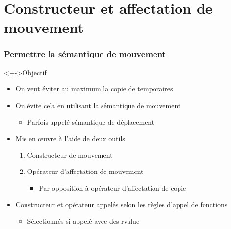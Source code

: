 \section{Constructeur et affectation de mouvement}

\begin{frame}
\frametitle{Permettre la sémantique de mouvement}
\begin{exampleblock}<+->{Objectif}
	\begin{itemize}[<+->]
	\item On veut éviter au maximum la copie de temporaires
	\end{itemize}
\end{exampleblock}
\begin{itemize}[<+->]
\item On évite cela en utilisant la sémantique de mouvement
	\begin{itemize}
	\item Parfois appelé sémantique de déplacement
	\end{itemize}
\item Mis en œuvre à l'aide de deux outils
	\begin{enumerate}
	\item Constructeur de mouvement
	\item Opérateur d'affectation de mouvement
		\begin{itemize}
		\item Par opposition à opérateur d'affectation de copie
		\end{itemize}
	\end{enumerate}
\item Constructeur et opérateur appelés selon les règles d'appel de fonctions
	\begin{itemize}
	\item Sélectionnés si appelé avec des rvalue
	\end{itemize}
\end{itemize}
\end{frame}

